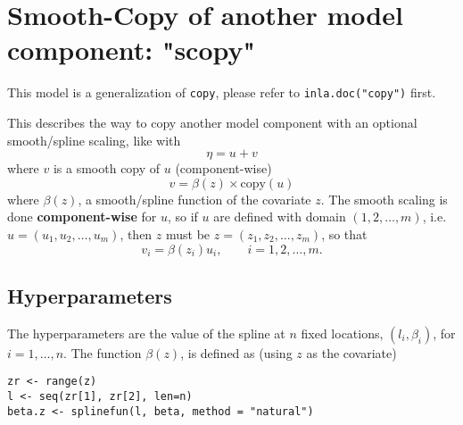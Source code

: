 \documentclass[a4paper,11pt]{article}
\begin{document}
\section*{Smooth-Copy of another model component: "scopy"}

This model is a generalization of \texttt{copy}, please refer to
\texttt{inla.doc("copy")} first.

This describes the way to copy another model component with an
optional smooth/spline scaling, like with
\begin{displaymath}
    \eta = u + v
\end{displaymath}
where $v$ is a smooth copy of $u$ (component-wise)
\begin{displaymath}
    v = \beta(z)\times\text{copy}(u)
\end{displaymath}
where $\beta(z)$, a smooth/spline function of the covariate $z$. The
smooth scaling is done \textbf{component-wise} for $u$, so if $u$ are
defined with domain $(1, 2, \ldots, m)$, i.e.\
$u=(u_1, u_2, \ldots, u_m)$, then $z$ must be
$z=(z_1, z_2, \ldots, z_m)$, so that
\begin{displaymath}
    v_i = \beta(z_i) u_i, \qquad i=1, 2, \ldots, m.
\end{displaymath}

\subsection*{Hyperparameters}

The hyperparameters are the value of the spline at $n$ fixed
locations, $(l_i, \beta_i)$, for $i=1, \ldots, n$. The function
$\beta(z)$, is defined as (using $z$ as the covariate)
\begin{verbatim}
zr <- range(z)
l <- seq(zr[1], zr[2], len=n)
beta.z <- splinefun(l, beta, method = "natural")
\end{verbatim}
\end{document}
